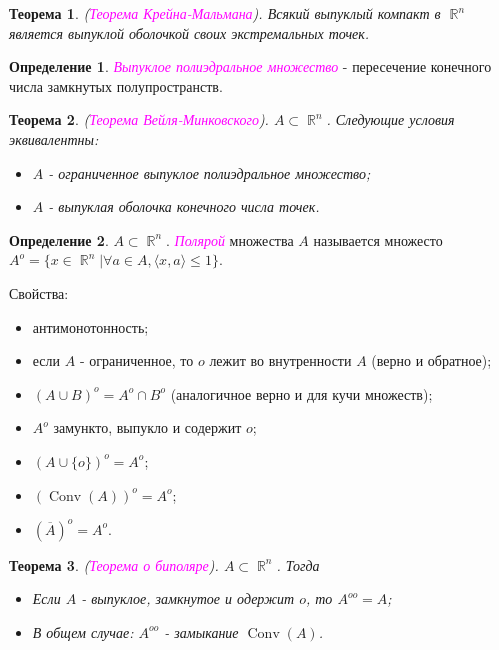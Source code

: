 \documentclass[a4paper,100pt]{article}
\theoremstyle{indented}
\newtheorem{theorem}{Теорема}
\theoremstyle{definition}
\newtheorem{defn}{Определение}
\theoremstyle{remark}
\DeclareMathOperator{\Conv}{Conv}
\DeclareMathOperator{\RR}{\mathbb{R}}
\begin{document}
\begin{theorem}
    (\textit{\textcolor{magenta}{\hypertarget{s102}{Теорема Крейна-Мальмана}}}). Всякий выпуклый компакт в $\RR^n$ является выпуклой оболочкой своих экстремальных точек. 
\end{theorem}

\begin{defn}
    \textit{\textcolor{magenta}{\hypertarget{s103}{Выпуклое полиэдральное множество}}} - пересечение конечного числа замкнутых полупространств.
\end{defn}

\begin{theorem}
    (\textit{\textcolor{magenta}{\hypertarget{s104}{Теорема Вейля-Минковского}}}). $A \subset \RR^n$. Следующие условия эквивалентны:

    \begin{itemize}
        \item $A$ - ограниченное выпуклое полиэдральное множество; 
        \item $A$ - выпуклая оболочка конечного числа точек.
    \end{itemize}
\end{theorem}

\begin{defn}
    $A \subset \RR^n$. \textit{\textcolor{magenta}{\hypertarget{s105}{Полярой}}} множества $A$ называется множесто $A^o = \{x \in \RR^n | \forall a \in A, \langle x, a \rangle \leq 1\}$. 
\end{defn}

Свойства:

\begin{itemize}
    \item антимонотонность; 
    \item если $A$ - ограниченное, то $o$ лежит во внутренности $A$ (верно и обратное); 
    \item $(A \cup B)^o = A^o \cap B^o$ (аналогичное верно и для кучи множеств); 
    \item $A^o$ замункто, выпукло и содержит $o$; 
    \item $(A \cup \{o\})^o = A^o$; 
    \item $(\Conv(A))^o = A^o$; 
    \item $(\overline{A})^o = A^o$. 
\end{itemize}

\begin{theorem}
    (\textit{\textcolor{magenta}{\hypertarget{s106}{Теорема о биполяре}}}). $A \subset \RR^n$. Тогда 

    \begin{itemize}
        \item Если $A$ - выпуклое, замкнутое и одержит $o$, то $A^{oo}=A$; 
        \item В общем случае: $A^{oo}$ - замыкание $\Conv(A)$. 
    \end{itemize}
\end{theorem}
\end{document}
